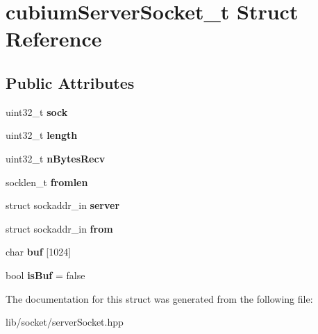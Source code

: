 \hypertarget{structcubiumServerSocket__t}{}\section{cubium\+Server\+Socket\+\_\+t Struct Reference}
\label{structcubiumServerSocket__t}
\subsection*{Public Attributes}
\begin{DoxyCompactItemize}
\item 
\mbox{\label{structcubiumServerSocket__t_a5159f109598a928b1aaabe1abe61bcb3}} 
uint32\+\_\+t {\bfseries sock}
\item 
\mbox{\label{structcubiumServerSocket__t_abab42f1ee816ec8020514ae922014783}} 
uint32\+\_\+t {\bfseries length}
\item 
\mbox{\label{structcubiumServerSocket__t_a5248230a046c0e0be78fea2ca1abaef5}} 
uint32\+\_\+t {\bfseries n\+Bytes\+Recv}
\item 
\mbox{\label{structcubiumServerSocket__t_a92189e1e1fdc939b85f2ec61a434ab9c}} 
socklen\+\_\+t {\bfseries fromlen}
\item 
\mbox{\label{structcubiumServerSocket__t_a24502fdef7b46f9c843ba9c7c0727082}} 
struct sockaddr\+\_\+in {\bfseries server}
\item 
\mbox{\label{structcubiumServerSocket__t_a190b687c6f4e9a792e237975ac613f5f}} 
struct sockaddr\+\_\+in {\bfseries from}
\item 
\mbox{\label{structcubiumServerSocket__t_a32dcf50a28a788d8b114c05d80b3a2d9}} 
char {\bfseries buf} \mbox{[}1024\mbox{]}
\item 
\mbox{\label{structcubiumServerSocket__t_a8f18b67d771fb4cbd1ec23e82acc120f}} 
bool {\bfseries is\+Buf} = false
\end{DoxyCompactItemize}


The documentation for this struct was generated from the following file\+:\begin{DoxyCompactItemize}
\item 
lib/socket/server\+Socket.\+hpp\end{DoxyCompactItemize}
